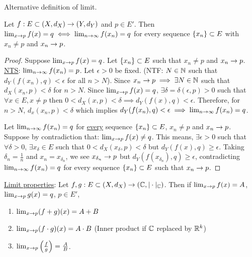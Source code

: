 \documentclass[]{article}
\begin{document}
Alternative definition of limit.

\begin{theorem}
	Let $f:E\subset(X,d_X)\rightarrow(Y,d_Y)$ and $p\in E'$.
	Then $\lim_{x\rightarrow p} f(x)=q \iff \lim_{n\rightarrow\infty} f(x_n) = q$ for every sequence $\left\{ x_n \right\}\subset E$ with $x_n\neq p$ and $x_n\rightarrow p$.
\end{theorem}
\begin{proof}
	\say{$\implies$} Suppose $\lim_{x\rightarrow p} f(x) = q$. Let $\left\{ x_n \right\}\subset E$ such that $x_n\neq p$ and $x_n\rightarrow p$.
	\ul{\ul{NTS}}: $\lim_{n\rightarrow\infty} f(x_n) = p$.
	Let $\epsilon>0$ be fixed. 
	(NTF: $N\in\mathbb{N}$ such that $d_Y(f(x_n),q)<\epsilon$ for all $n>N$).
	Since $x_n\rightarrow p \implies \exists N\in\mathbb{N}$ such that $d_X(x_n,p)<\delta$ for $n>N$.
	Since $\lim_{x\rightarrow p} f(x) = q$, $\exists\delta=\delta(\epsilon,p)>0$ such that $\forall x\in E,x\neq p$ then $0<d_X(x,p)<\delta\implies d_Y(f(x),q)<\epsilon$.
	Therefore, for $n>N$, $d_x(x_n,p)<\delta$ which implies $d_Y(f(x_n),q)<\epsilon \implies \lim_{n\rightarrow\infty}f(x_n)=q$.

	\say{$\Lla$} Let $\lim_{n\rightarrow\infty} f(x_n) = q$ for \ul{every} sequence $\left\{ x_n \right\}\subset E$, $x_n\neq p$ and $x_n\rightarrow p$.
	Suppose by contradiction that: $\lim_{x\rightarrow p} f(x)\neq q$.
	This means, $\exists\epsilon>0$ such that \ul{$\forall\delta>0$}, $\exists x_\delta\in E$ such that $0<d_X(x_\delta,p)<\delta$ but $d_Y(f(x),q)\geq \epsilon$.
	Taking $\delta_n = \frac1n$ and $x_n = x_{\delta_n}$, we see $x_{\delta_n}\rightarrow p$ but $d_Y(f(x_{\delta_n}),q)\geq\epsilon$, contradicting $\lim_{n\rightarrow\infty} f(x_n)=q$ for every sequence $\left\{ x_n \right\}\subset E$ such that $x_n\rightarrow p$.
\end{proof}

\ul{Limit properties}: Let $f,g:E\subset(X,d_X)\rightarrow(\mathbb{C},|\cdot|_{\mathbb{C}})$.
Then if $\lim_{x\rightarrow p} f(x) = A$, $\lim_{x\rightarrow p} g(x) = q$, $p\in E'$,
\begin{enumerate}
	\item $\lim_{x\rightarrow p} (f+g)(x) = A+B$
	\item $\lim_{x\rightarrow p} (f\cdot g)(x) = A\cdot B$ (Inner product if $\mathbb{C}$ replaced by $\mathbb{R}^k$)
	\item $\lim_{x\rightarrow p} \left(\frac fg\right) = \frac AB$.
\end{enumerate}
\end{document}
